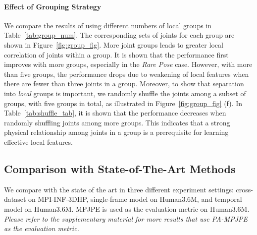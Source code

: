 \documentclass[runningheads]{llncs}
\begin{document}
\paragraph{\textbf{Effect of Grouping Strategy}} We compare the results of using different numbers of local groups in Table~\ref{tab:group_num}. The corresponding sets of joints for each group are shown in Figure~\ref{fig:group_fig}. More joint groups leads to greater local correlation of joints within a group. It is shown that the performance first improves with more groups, especially in the \emph{Rare Pose} case. However, with more than five groups,
the performance drops due to weakening of local features when there are fewer than three joints in a group.
Moreover, to show that separation into {\em local} groups is important, we randomly shuffle the joints among a subset of groups, with five groups in total, as illustrated in Figure~\ref{fig:group_fig} (f). In Table~\ref{tab:shuffle_tab}, it is shown that the performance decreases when randomly shuffling joints among more groups. This indicates that a strong physical relationship among joints in a group is a prerequisite for learning effective local features.






















\subsection{Comparison with State-of-The-Art Methods}
\label{sec:data_result}
We compare with the state of the art in three different experiment settings: cross-dataset on MPI-INF-3DHP, single-frame model on Human3.6M, and temporal model on Human3.6M. MPJPE is used as the evaluation metric on Human3.6M. \emph{Please refer to the supplementary material for more results that use PA-MPJPE as the evaluation metric.}
\end{document}
